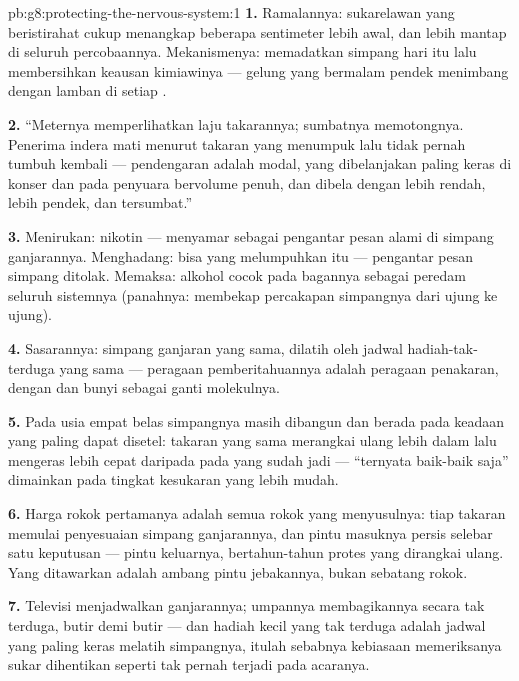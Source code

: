 \begin{solution}{pb:g8:protecting-the-nervous-system:1}
\textbf{1.} Ramalannya: sukarelawan yang beristirahat cukup
menangkap beberapa sentimeter lebih awal, dan lebih mantap
di seluruh percobaannya. Mekanismenya:  memadatkan
simpang hari itu lalu membersihkan keausan kimiawinya ---
gelung yang bermalam pendek menimbang dengan lamban di
setiap .

\textbf{2.} ``Meternya memperlihatkan laju takarannya;
sumbatnya memotongnya. Penerima indera  mati
menurut takaran yang menumpuk lalu tidak pernah tumbuh
kembali --- pendengaran adalah modal, yang dibelanjakan
paling keras di konser dan pada penyuara  bervolume
penuh, dan dibela dengan lebih rendah, lebih pendek, dan
tersumbat.''

\textbf{3.} Menirukan: nikotin --- menyamar sebagai
pengantar pesan alami di simpang ganjarannya. Menghadang:
bisa yang melumpuhkan itu --- pengantar pesan simpang
 ditolak. Memaksa: alkohol cocok pada bagannya
sebagai peredam seluruh sistemnya (panahnya: membekap
percakapan simpangnya dari ujung ke ujung).

\textbf{4.} Sasarannya: simpang ganjaran yang sama, dilatih
oleh jadwal hadiah-tak-terduga yang sama --- peragaan
pemberitahuannya adalah peragaan penakaran, dengan 
dan bunyi sebagai ganti molekulnya.

\textbf{5.} Pada usia empat belas simpangnya masih dibangun
dan berada pada keadaan yang paling dapat disetel: takaran
yang sama merangkai ulang lebih dalam lalu mengeras lebih
cepat daripada pada  yang sudah jadi --- ``ternyata
baik-baik saja'' dimainkan pada tingkat kesukaran yang
lebih mudah.

\textbf{6.} Harga rokok pertamanya adalah semua rokok yang
menyusulnya: tiap takaran memulai penyesuaian simpang
ganjarannya, dan pintu masuknya persis selebar satu
keputusan --- pintu keluarnya, bertahun-tahun protes yang
dirangkai ulang. Yang ditawarkan adalah ambang pintu
jebakannya, bukan sebatang rokok.

\textbf{7.} Televisi menjadwalkan ganjarannya; umpannya
membagikannya secara tak terduga, butir demi butir --- dan
hadiah kecil yang tak terduga adalah jadwal yang paling
keras melatih simpangnya, itulah sebabnya kebiasaan
memeriksanya sukar dihentikan seperti tak pernah terjadi
pada acaranya.


\end{solution}
